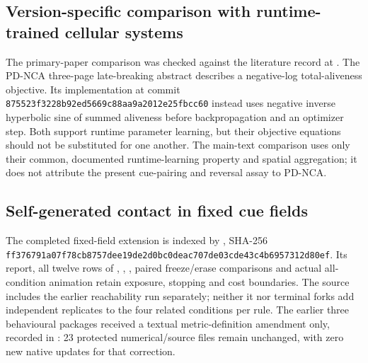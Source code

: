 \subsection*{Version-specific comparison with runtime-trained cellular systems}
The primary-paper comparison was checked against the literature record at . The PD-NCA three-page late-breaking abstract describes a negative-log total-aliveness objective. Its implementation at commit \texttt{875523f3228b92ed5669c88aa9a2012e25fbcc60} instead uses negative inverse hyperbolic sine of summed aliveness before backpropagation and an optimizer step. Both support runtime parameter learning, but their objective equations should not be substituted for one another. The main-text comparison uses only their common, documented runtime-learning property and spatial aggregation; it does not attribute the present cue-pairing and reversal assay to PD-NCA.

\subsection*{Self-generated contact in fixed cue fields}
The completed fixed-field extension is indexed by , SHA-256 \texttt{ff376791\allowbreak{}a07f78cb\allowbreak{}8757dee1\allowbreak{}9de2d0bc\allowbreak{}0deac707\allowbreak{}de03cde4\allowbreak{}3c4b6957\allowbreak{}312d80ef}. Its report, all twelve rows of , , , paired freeze/erase comparisons and actual all-condition animation retain exposure, stopping and cost boundaries. The source includes the earlier reachability run separately; neither it nor terminal forks add independent replicates to the four related conditions per rule. The earlier three behavioural packages received a textual metric-definition amendment only, recorded in : 23 protected numerical/source files remain unchanged, with zero new native updates for that correction.








